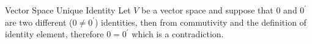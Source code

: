 \begin{theo*}{Vector Space Unique Identity}
  Let $ V$ be a vector space and suppose that $ 0 $ and $ 0 ^{\prime} $ are two different ($ 0 \neq  0 ^{\prime} $) identities, then 
  from commutivity and the definition of identity element, therefore $ 0 =  0 ^{\prime} $ which is a contradiction.
\end{theo*}
